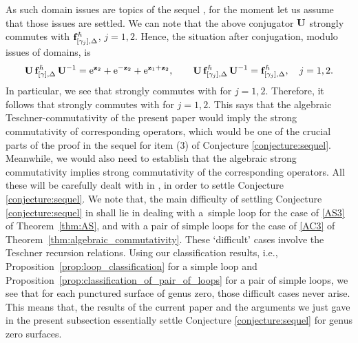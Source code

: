 \documentclass[10pt,a4paper]{amsart}
\numberwithin{equation}{section}
\theoremstyle{definition}
\begin{document}
As such domain issues are topics of the sequel \cite{sequel}, for the moment let us assume that those issues are settled. We can note that the above conjugator ${\bf U}$ strongly commutes with ${\bf f}^\hbar_{[\gamma_j],\Delta}$, $j=1,2$. Hence, the situation after conjugation, modulo issues of domains, is
\[
{\bf U} \, {\bf f}^\hbar_{[\gamma],\Delta} \, {\bf U}^{-1}
= {\rm e}^{{\bf z}_2} + {\rm e}^{-{\bf z}_2} + {\rm e}^{{\bf z}_1+{\bf z}_2}, \qquad
{\bf U} \, {\bf f}^\hbar_{[\gamma_j],\Delta} \, {\bf U}^{-1}
= {\bf f}^\hbar_{[\gamma_j],\Delta} , \quad j=1,2.
\]
In particular, we see that  strongly commutes with  for $j=1,2$. Therefore, it follows that  strongly commutes with  for $j=1,2$. This says that the algebraic Teschner-commutativity of the present paper would imply the strong commutativity of corresponding operators, which would be one of the crucial parts of the proof in the sequel \cite{sequel} for item (3) of Conjecture \ref{conjecture:sequel}. Meanwhile, we would also need to establish that the algebraic strong commutativity implies strong commutativity of the corresponding operators.
All these will be carefully dealt with in \cite{sequel}, in order to settle Conjecture \ref{conjecture:sequel}.
We note that, the main difficulty of settling Conjecture \ref{conjecture:sequel} in \cite{sequel} shall lie in dealing with a~simple loop for the case of \ref{AS3} of Theorem~\ref{thm:AS}, and with a pair of simple loops for the case of \ref{AC3} of Theorem~\ref{thm:algebraic_commutativity}. These `difficult' cases involve the Teschner recursion relations. Using our classification results, i.e., Proposition~\ref{prop:loop_classification} for a simple loop and Proposition~\ref{prop:classification_of_pair_of_loops} for a pair of simple loops, we see that for each punctured surface of genus zero, those difficult cases never arise. This means that, the results of the current paper and the arguments we just gave in the present subsection essentially settle Conjecture \ref{conjecture:sequel} for genus zero surfaces.
\end{document}

